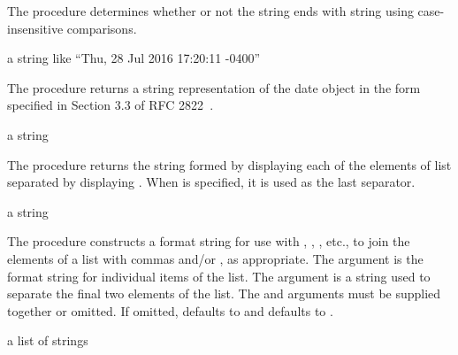 The  procedure determines whether or not the
string  ends with string  using case-insensitive
comparisons.

\begin{procedure}
\end{procedure}
\returns{} a string like ``Thu, 28 Jul 2016 17:20:11 -0400''

The  procedure returns a string representation of
the date object  in the form specified in Section 3.3 of RFC
2822~\cite{RFC2822}.

\begin{procedure}
\end{procedure}
\returns{} a string

The  procedure returns the string formed by displaying each
of the elements of list  separated by displaying
. When  is specified, it is used as
the last separator.

\begin{procedure}
\end{procedure}
\returns{} a string

The  procedure constructs a format string for use with
, , , etc., to join the elements
of a list with commas and/or , as appropriate.
The  argument is the format string for individual
items of the list.
The  argument is a string used to separate the final two elements
of the list.
The  and  arguments must be supplied together or
omitted.
If omitted,  defaults to  and 
defaults to .

\begin{procedure}
\end{procedure}
\returns{} a list of strings

